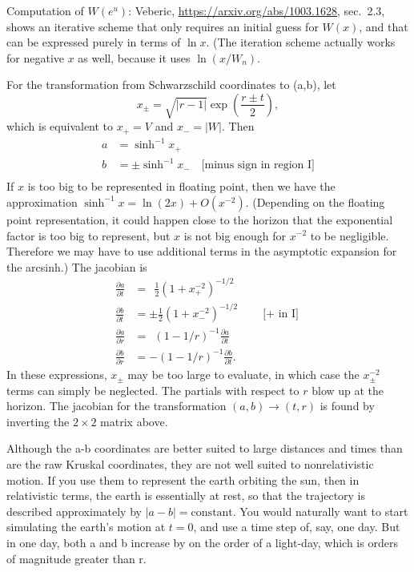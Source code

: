\documentclass{article}
\begin{document}
Computation of $W(e^u)$:
Veberic, \url{https://arxiv.org/abs/1003.1628}, sec.~2.3, shows an iterative
scheme that only requires an initial guess for $W(x)$, and that can be expressed purely
in terms of $\ln x$. (The iteration scheme actually works for negative $x$ as well, because
it uses $\ln(x/W_n)$.

For the transformation from Schwarzschild coordinates to (a,b), let
\begin{equation*}
  x_\pm = \sqrt{|r-1|}\exp\left(\frac{r\pm t}{2}\right),
\end{equation*}
which is equivalent to $x_+= V$ and $x_-=|W|$.
Then
\begin{align*}
  a &= \sinh^{-1} x_+ \\
  b &= \pm\sinh^{-1} x_- \quad \text{[minus sign in region I]} \\
\end{align*}
If $x$ is too big to be represented in floating point, then we have the approximation
$\sinh^{-1} x = \ln(2x)+O(x^{-2})$. (Depending on the floating point representation,
it could happen close to the horizon that the exponential
factor is too big to represent, but $x$ is not big enough for $x^{-2}$ to be negligible.
Therefore we may have to use additional terms in the asymptotic expansion for the arcsinh.)
The jacobian is
\begin{align*}
  \frac{\partial a}{\partial t} &= \ \ \frac{1}{2}(1+x_+^{-2})^{-1/2} \\
  \frac{\partial b}{\partial t} &= \pm\frac{1}{2}(1+x_-^{-2})^{-1/2} \qquad \text{[$+$ in I]} \\
  \frac{\partial a}{\partial r} &= \ \ (1-1/r)^{-1} \frac{\partial a}{\partial t} \\
  \frac{\partial b}{\partial r} &= -(1-1/r)^{-1} \frac{\partial b}{\partial t}.
\end{align*}
In these expressions, $x_\pm$ may be too large to evaluate, in which case the $x_\pm^{-2}$ terms
can simply be neglected. The partials with respect to $r$ blow up at the horizon. The jacobian
for the transformation $(a,b)\rightarrow(t,r)$ is found by inverting the $2\times 2$ matrix
above.

Although the a-b coordinates are better suited to large distances and times than are the
raw Kruskal coordinates, they are not well suited to nonrelativistic motion. If you use them
to represent the earth orbiting the sun, then in relativistic terms, the earth is essentially
at rest, so that the trajectory is described approximately by $|a-b|=\text{constant}$.
You would naturally want to start simulating the earth's motion at $t=0$, and use a time step
of, say, one day. But in one day, both a and b increase by on the order of a light-day, which
is orders of magnitude greater than r.
\end{document}
